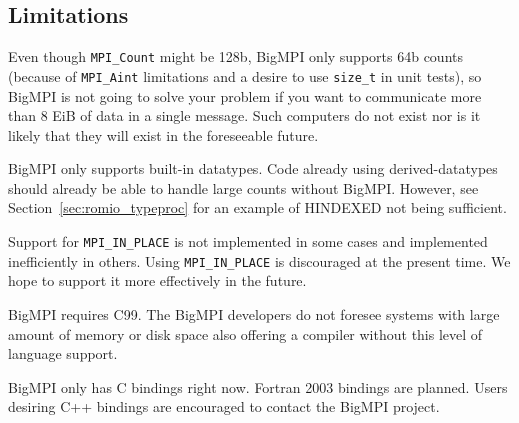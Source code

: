 \subsection{Limitations}

Even though \texttt{MPI\_Count} might be 128b, BigMPI only supports
64b counts (because of \texttt{MPI\_Aint} limitations and a desire to use \texttt{size\_t}
in unit tests), so BigMPI is not going to solve your problem if you
want to communicate more than 8 EiB of data in a single message.
Such computers do not exist nor is it likely that they will exist
in the foreseeable future.

BigMPI only supports built-in datatypes.  Code already using
derived-datatypes should already be able to handle large counts without BigMPI\@.
However, see Section~\ref{sec:romio_typeproc} for an example of HINDEXED not
being sufficient.

Support for \texttt{MPI\_IN\_PLACE} is not implemented in some cases and
implemented inefficiently in others.
Using \texttt{MPI\_IN\_PLACE} is discouraged at the present time.
We hope to support it more effectively in the future.

BigMPI requires C99.  The BigMPI developers do not foresee systems with large
amount of memory or disk space also offering a compiler without this level of language support.

BigMPI only has C bindings right now.
Fortran 2003 bindings are planned.
Users desiring C++ bindings are encouraged to contact the BigMPI project.
